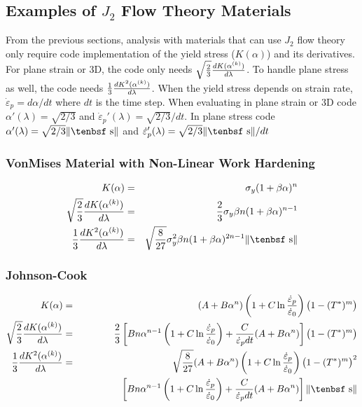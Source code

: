 \documentclass[11pt]{article}
\def\dev{\hbox{\tenbsf s}}
\begin{document}
\subsection{Examples of $J_2$ Flow Theory Materials}

From the previous sections, analysis with materials that can use $J_2$ flow theory only require code implementation of the yield stress ($K(\alpha)$) and its derivatives. For plane strain or 3D, the code only needs $\sqrt{2\over3}{dK(\alpha^{(k)})\over d\lambda}$. To handle plane stress as well, the code needs ${1\over3}{dK^2(\alpha^{(k)})\over d\lambda}$. When the yield stress depends on strain rate, $\dot{\varepsilon}_p = d\alpha/dt$ where $dt$ is the time step. When evaluating in plane strain or 3D code $\alpha'(\lambda) = \sqrt{2/3}$ and $\dot{\varepsilon}_p'(\lambda) = \sqrt{2/3}/dt$. In plane stress code $\alpha'(\lambda) = \sqrt{2/3}\|\dev\|$ and $\dot{\varepsilon}_p'(\lambda) = \sqrt{2/3}\|\dev\|/dt$

\subsubsection{VonMises Material with Non-Linear Work Hardening}

\begin{eqnarray}
   K(\alpha) & = & \sigma_y(1+\beta\alpha)^n \\
   \sqrt{2\over3}{dK(\alpha^{(k)})\over d\lambda} & = & {2\over 3} \sigma_y \beta n (1+\beta\alpha)^{n-1} \\
   {1\over3}{dK^2(\alpha^{(k)})\over d\lambda} & = & \sqrt{8\over27} \sigma_y^2 \beta n  (1+\beta\alpha)^{2n-1} \|\dev\|
\end{eqnarray}

\subsubsection{Johnson-Cook}

\begin{eqnarray}
   K(\alpha) & = &  (A+B\alpha^n)\left(1+C\ln{\dot{\varepsilon}_p\over \dot{\varepsilon}_0}\right)\bigl(1-(T^*)^m\bigr) \\
   \sqrt{2\over3}{dK(\alpha^{(k)})\over d\lambda} & = &  {2\over 3} \left[B n \alpha^{n-1}\left(1+C\ln{\dot{\varepsilon}_p\over \dot{\varepsilon}_0}\right)
                  + {C\over \dot{\varepsilon}_p dt}(A+B\alpha^n)
              \right] \bigl(1-(T^*)^m\bigr)\\
   {1\over3}{dK^2(\alpha^{(k)})\over d\lambda} & = & \sqrt{8\over27}(A+B\alpha^n)\left(1+C\ln{\dot{\varepsilon}_p\over \dot{\varepsilon}_0}\right)
                   \bigl(1-(T^*)^m\bigr)^2  \nonumber \\
    && \qquad\qquad\mbox{}
              \left[B n \alpha^{n-1}\left(1+C\ln{\dot{\varepsilon}_p\over \dot{\varepsilon}_0}\right)
                  + {C\over \dot{\varepsilon}_p dt}(A+B\alpha^n)
              \right]  \|\dev\|
\end{eqnarray}
\end{document}
